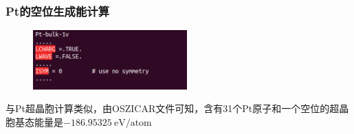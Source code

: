 \frame
{
	\frametitle{\textrm{Pt}的空位生成能计算}
\begin{figure}[h!]
\centering
\includegraphics[height=0.9in,viewport=0 15 370 180,clip]{Figures/Pt_vacancy-INCAR.png}
\caption{\fontsize{6.2pt}{5.2pt}}%
\label{Pt_Bulk-INCAR-modified-2}
\end{figure}
与\textrm{Pt}超晶胞计算类似，由\textrm{OSZICAR}文件可知，含有31个\textrm{Pt}原子和一个空位的超晶胞基态能量是$-186.95325\mathrm{~eV/atom}$
}

